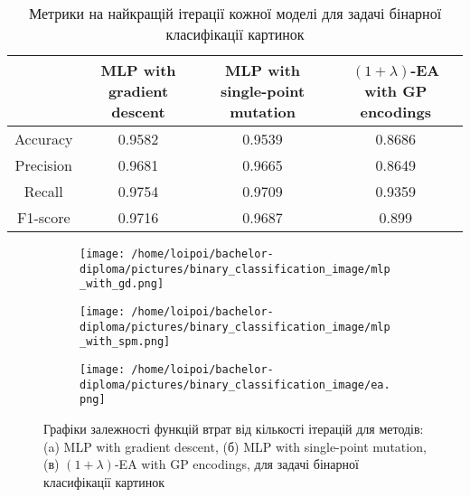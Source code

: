 \begin{table}[ht]
	\centering
	\begin{adjustbox}{max width=\textwidth}
		\begin{tabular}{|c|c|c|c|}
			\hline 
			& MLP with gradient descent & MLP with single-point mutation & $(1+\lambda)$-EA with GP encodings \\
			\hline 
			Accuracy & 0.9582 & 0.9539 & 0.8686 \\
			\hline 
			Precision & 0.9681 & 0.9665 & 0.8649 \\
			\hline
			Recall & 0.9754 & 0.9709 & 0.9359 \\
			\hline
			F1-score & 0.9716 & 0.9687 & 0.899 \\
			\hline
		\end{tabular}
	\end{adjustbox}
	\caption{Метрики на найкращій ітерації кожної моделі для задачі бінарної класифікації картинок}
	\label{metrics_bc_id_results}
\end{table}

\begin{figure}[ht]
	\centering
	\begin{subfigure}[b]{0.32\textwidth}    
		\texttt{[image: /home/loipoi/bachelor-diploma/pictures/binary\_classification\_image/mlp\_with\_gd.png]}
		\caption{}
	\end{subfigure}	
	\begin{subfigure}[b]{0.32\textwidth}
		\texttt{[image: /home/loipoi/bachelor-diploma/pictures/binary\_classification\_image/mlp\_with\_spm.png]}
		\caption{}
	\end{subfigure}	
	\begin{subfigure}[b]{0.32\textwidth}
		\texttt{[image: /home/loipoi/bachelor-diploma/pictures/binary\_classification\_image/ea.png]}
		\caption{}
	\end{subfigure}
	
	\caption{Графіки залежності функцій втрат від кількості ітерацій для методів: (a) MLP with gradient descent, (б) MLP with single-point mutation, (в) $(1+\lambda)$-EA with GP encodings, для задачі бінарної класифікації картинок}
	\label{fig_losses_bc_id}
\end{figure}

